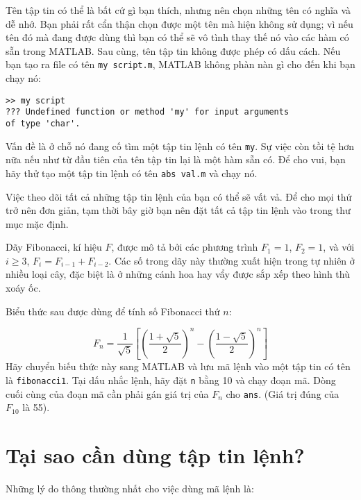 \documentclass[12pt]{book}
\begin{document}
Tên tập tin có thể là bất cứ gì bạn thích, nhưng nên chọn những tên có
nghĩa và dễ nhớ. Bạn phải rất cẩn thận chọn được một tên mà hiện 
không sử dụng; vì nếu tên đó mà đang được dùng thì bạn có thể sẽ
vô tình thay thế nó vào các hàm có sẵn trong MATLAB. Sau cùng, tên
tập tin không được phép có dấu cách. Nếu bạn tạo ra file có tên
{\tt my script.m}, MATLAB không phàn nàn gì cho đến khi bạn chạy nó:

\begin{verbatim}
>> my script
??? Undefined function or method 'my' for input arguments 
of type 'char'.
\end{verbatim}

Vấn đề là ở chỗ nó đang cố tìm một tập tin lệnh có tên {\tt my}.  Sự việc
còn tồi tệ hơn nữa nếu như từ đầu tiên của tên tập tin lại là một hàm
sẵn có. Để cho vui, bạn hãy thử tạo một tập tin lệnh có tên {\tt abs val.m}
và chạy nó.

Việc theo dõi tất cả những tập tin lệnh của bạn có thể sẽ vất vả. Để cho
mọi thứ trở nên đơn giản, tạm thời bây giờ bạn nên đặt tất cả tập tin 
lệnh vào trong thư mục mặc định.

\begin{ex}
Dãy Fibonacci, kí hiệu $F$, được mô tả bởi các phương trình 
$F_1 = 1$, $F_2 = 1$, và với $i \ge 3$, $F_{i} = F_{i-1} + F_{i-2}$.
Các số trong dãy này thường xuất hiện trong tự nhiên ở nhiều loại cây,
đặc biệt là ở những cánh hoa hay vẩy được sắp xếp theo hình thù
xoáy ốc.

Biểu thức sau được dùng để tính số Fibonacci thứ $n$:

\begin{equation}
F_n = \frac{1}{\sqrt{5}}
\left[ 
\left( \frac{1 + \sqrt{5}}{2} \right)^{n} -
\left( \frac{1 - \sqrt{5}}{2} \right)^{n}
\right]
\end{equation}
%
Hãy chuyển biếu thức này sang MATLAB và lưu mã lệnh vào
một tập tin có tên là {\tt fibonacci1}.  Tại dấu nhắc lệnh, hãy
đặt {\tt n} bằng 10 và chạy đoạn mã. Dòng cuối cùng của đoạn mã
cần phải gán giá trị của $F_n$ cho {\tt ans}.
(Giá trị đúng của $F_{10}$ là 55).
\end{ex}


\section{Tại sao cần dùng tập tin lệnh?}

Những lý do thông thường nhất cho việc dùng mã lệnh là:
\end{document}
